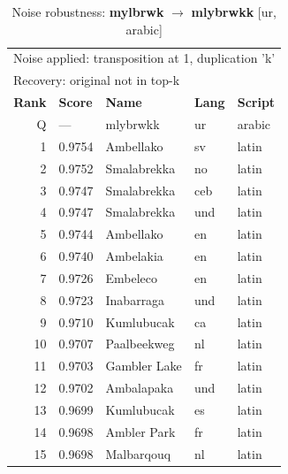 \begin{table}[htbp]
\centering
\small
\caption{Noise robustness: \textbf{mylbrwk} $\rightarrow$ \textbf{mlybrwkk} [ur, arabic]}
\label{tab:noise-39}
\begin{tabular}{rllll}
\toprule
\multicolumn{5}{l}{\small Noise applied: transposition at 1, duplication 'k'} \\
\multicolumn{5}{l}{\small Recovery: original not in top-k} \\
\midrule
\textbf{Rank} & \textbf{Score} & \textbf{Name} & \textbf{Lang} & \textbf{Script} \\
\midrule
\rowcolor{gray!20} Q & --- & mlybrwkk & ur & arabic \\
\midrule
1 & 0.9754 & Ambellako & sv & latin \\
2 & 0.9752 & Smalabrekka & no & latin \\
3 & 0.9747 & Smalabrekka & ceb & latin \\
4 & 0.9747 & Smalabrekka & und & latin \\
5 & 0.9744 & Ambellako & en & latin \\
6 & 0.9740 & Ambelakia & en & latin \\
7 & 0.9726 & Embeleco & en & latin \\
8 & 0.9723 & Inabarraga & und & latin \\
9 & 0.9710 & Kumlubucak & ca & latin \\
10 & 0.9707 & Paalbeekweg & nl & latin \\
11 & 0.9703 & Gambler Lake & fr & latin \\
12 & 0.9702 & Ambalapaka & und & latin \\
13 & 0.9699 & Kumlubucak & es & latin \\
14 & 0.9698 & Ambler Park & fr & latin \\
15 & 0.9698 & Malbarqouq & nl & latin \\
\bottomrule
\end{tabular}
\end{table}


